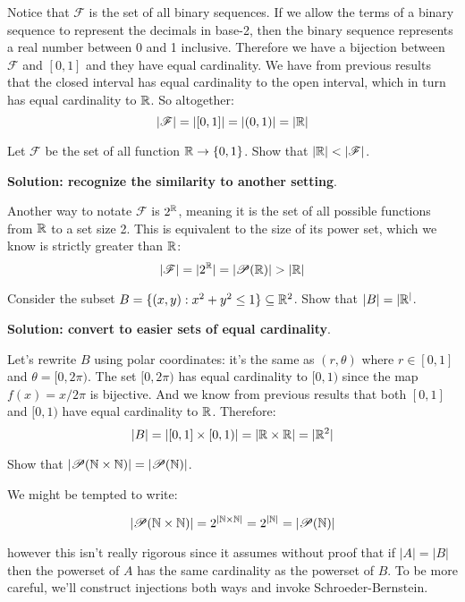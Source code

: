 \documentclass{article}
\begin{document}
Notice that $\mathscr{F}$ is the set of all binary sequences. If we allow the terms of a binary sequence to represent the decimals in base-2, then the binary sequence represents a real number between 0 and 1 inclusive. Therefore we have a bijection between $\mathscr{F}$ and $[0, 1]$ and they have equal cardinality. We have from previous results that the closed interval has equal cardinality to the open interval, which in turn has equal cardinality to $\mathbb{R}$. So altogether:
$$|\mathscr{F}| = |[0, 1]| = |(0, 1)| = |\mathbb{R}|$$

\begin{problem}
Let $\mathscr{F}$ be the set of all function $\mathbb{R} \to \{0, 1\}$. Show that $|\mathbb{R}| < |\mathscr{F}|$.
\end{problem}

\textbf{Solution: recognize the similarity to another setting}.

Another way to notate $\mathscr{F}$ is $2^{\mathbb{R}}$, meaning it is the set of all possible functions from $\mathbb{R}$ to a set size 2. This is equivalent to the size of its power set, which we know is strictly greater than $\mathbb{R}$:
$$|\mathscr{F}| = |2^{\mathbb{R}}| = |\mathscr{P}(\mathbb{R})| > |\mathbb{R}|$$

\begin{problem}
Consider the subset $B = \{(x, y): x^2 + y^2 \leq 1\} \subseteq \mathbb{R}^2$. Show that $|B| = |\mathbb{R}^|$.
\end{problem}

\textbf{Solution: convert to easier sets of equal cardinality}.

Let's rewrite $B$ using polar coordinates: it's the same as $(r, \theta)$ where $r \in [0, 1]$ and $\theta = [0, 2\pi)$. The set $[0, 2\pi)$ has equal cardinality to $[0, 1)$ since the map $f(x) = x/2\pi$ is bijective. And we know from previous results that both $[0, 1]$ and $[0, 1)$ have equal cardinality to $\mathbb{R}$. Therefore:
$$|B| = |[0, 1] \times [0, 1)| = |\mathbb{R} \times \mathbb{R}| = |\mathbb{R}^2|$$

\begin{problem}
Show that $|\mathscr{P}(\mathbb{N} \times \mathbb{N})| = |\mathscr{P}(\mathbb{N})|$.
\end{problem}

We might be tempted to write:

$$|\mathscr{P}(\mathbb{N} \times \mathbb{N})| = 2^{|\mathbb{N} \times \mathbb{N}|} = 2^{|\mathbb{N}|} = |\mathscr{P}(\mathbb{N})|$$

however this isn't really rigorous since it assumes without proof that if $|A| = |B|$ then the powerset of $A$ has the same cardinality as the powerset of $B$. To be more careful, we'll construct injections both ways and invoke Schroeder-Bernstein.
\end{document}
